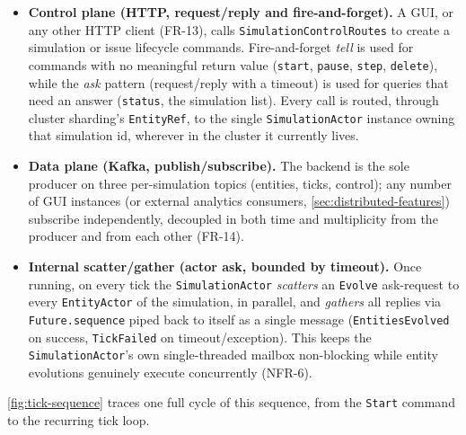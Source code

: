 \documentclass{scrreprt}
\begin{document}
\begin{itemize}
  \item \textbf{Control plane (HTTP, request/reply and fire-and-forget).} A GUI, or any other
  HTTP client (\textsc{FR-13}), calls \texttt{SimulationControlRoutes} to create a simulation
  or issue lifecycle commands. Fire-and-forget \emph{tell} is used for commands with no
  meaningful return value (\texttt{start}, \texttt{pause}, \texttt{step}, \texttt{delete}),
  while the \emph{ask} pattern (request/reply with a timeout) is used for queries that need an
  answer (\texttt{status}, the simulation list). Every call is routed, through cluster
  sharding's \texttt{EntityRef}, to the single \texttt{SimulationActor} instance owning that
  simulation id, wherever in the cluster it currently lives.
  \item \textbf{Data plane (Kafka, publish/subscribe).} The backend is the sole producer on
  three per-simulation topics (entities, ticks, control); any number of GUI instances (or
  external analytics consumers, \cref{sec:distributed-features}) subscribe independently,
  decoupled in both time and multiplicity from the producer and from each other
  (\textsc{FR-14}).
  \item \textbf{Internal scatter/gather (actor ask, bounded by timeout).} Once running, on
  every tick the \texttt{SimulationActor} \emph{scatters} an \texttt{Evolve} ask-request to
  every \texttt{EntityActor} of the simulation, in parallel, and \emph{gathers} all replies
  via \texttt{Future.sequence} piped back to itself as a single message
  (\texttt{EntitiesEvolved} on success, \texttt{TickFailed} on timeout/exception). This keeps
  the \texttt{SimulationActor}'s own single-threaded mailbox non-blocking while entity
  evolutions genuinely execute concurrently (\textsc{NFR-6}).
\end{itemize}

\cref{fig:tick-sequence} traces one full cycle of this sequence, from the \texttt{Start}
command to the recurring tick loop.
\end{document}
